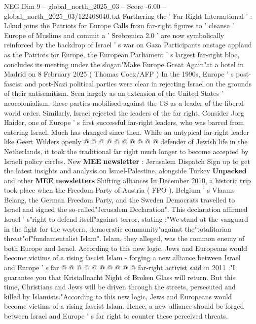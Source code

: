 \begin{textsample}{NEG Dim 9 – global\_north\_2025\_03 – Score -6.00 – global\_north\_2025\_03/122408040.txt}  \label{ex:f9_neg_073}
Furthering the ' Far-Right International ' : Likud joins the Patriots for Europe Calls from far-right figures to ' cleanse ' Europe of Muslims and commit a ' Srebrenica 2.0 ' are now symbolically reinforced by the backdrop of Israel ' s war on Gaza Participants onstage applaud as the Patriots for Europe, the European Parliament ' s largest far-right bloc, concludes its meeting under the slogan"Make Europe Great Again"at a hotel in Madrid on 8 February 2025 ( Thomas Coex/AFP ) In the 1990s, Europe ' s post-fascist and post-Nazi political parties were clear in rejecting Israel on the grounds of their antisemitism.
Seen largely as an extension of the United States ' neocolonialism, these parties mobilised against the US as a leader of the liberal world order.
Similarly, Israel rejected the leaders of the far right.
Consider Jorg Haider, one of Europe ' s first successful far-right leaders, who was barred from entering Israel.
Much has changed since then.
While an untypical far-right leader like Geert Wilders openly @ @ @ @ @ @ @ @ @ @ defender of Jewish life in the Netherlands, it took the traditional far right much longer to become accepted by Israeli policy circles.
New \textbf{MEE} \textbf{newsletter} : Jerusalem Dispatch Sign up to get the latest insights and analysis on Israel-Palestine, alongside Turkey \textbf{Unpacked} and other \textbf{MEE} \textbf{newsletters} Shifting alliances In December 2010, a historic trip took place when the Freedom Party of Austria ( FPO ), Belgium ' s Vlaams Belang, the German Freedom Party, and the Sweden Democrats travelled to Israel and signed the so-called"Jerusalem Declaration".
This declaration affirmed Israel ' s"right to defend itself"against terror, stating :"We stand at the vanguard in the fight for the western, democratic community"against the"totalitarian threat"of"fundamentalist Islam".
Islam, they alleged, was the common enemy of both Europe and Israel.
According to this new logic, Jews and Europeans would become victims of a rising fascist Islam - forging a new alliance between Israel and Europe ' s far @ @ @ @ @ @ @ @ @ @ far-right activist said in 2011 :"I guarantee you that Kristallnacht Night of Broken Glass will return.
But this time, Christians and Jews will be driven through the streets, persecuted and killed by Islamists."According to this new logic, Jews and Europeans would become victims of a rising fascist Islam.
Hence, a new alliance should be forged between Israel and Europe ' s far right to counter these perceived threats.

\end{textsample}
